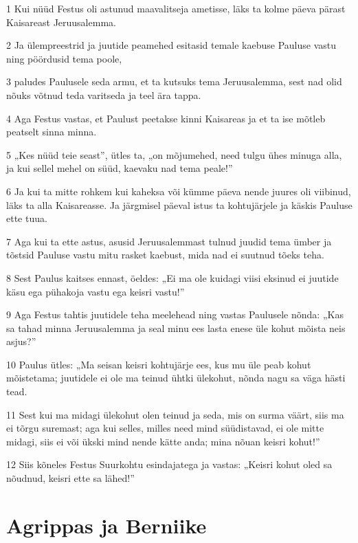 \par 1 Kui nüüd Festus oli astunud maavalitseja ametisse, läks ta kolme päeva pärast Kaisareast Jeruusalemma.
\par 2 Ja ülempreestrid ja juutide peamehed esitasid temale kaebuse Pauluse vastu ning pöördusid tema poole,
\par 3 paludes Paulusele seda armu, et ta kutsuks tema Jeruusalemma, sest nad olid nõuks võtnud teda varitseda ja teel ära tappa.
\par 4 Aga Festus vastas, et Paulust peetakse kinni Kaisareas ja et ta ise mõtleb peatselt sinna minna.
\par 5 „Kes nüüd teie seast”, ütles ta, „on mõjumehed, need tulgu ühes minuga alla, ja kui sellel mehel on süüd, kaevaku nad tema peale!”
\par 6 Ja kui ta mitte rohkem kui kaheksa või kümme päeva nende juures oli viibinud, läks ta alla Kaisareasse. Ja järgmisel päeval istus ta kohtujärjele ja käskis Pauluse ette tuua.
\par 7 Aga kui ta ette astus, asusid Jeruusalemmast tulnud juudid tema ümber ja tõstsid Pauluse vastu mitu rasket kaebust, mida nad ei suutnud tõeks teha.
\par 8 Sest Paulus kaitses ennast, öeldes: „Ei ma ole kuidagi viisi eksinud ei juutide käsu ega pühakoja vastu ega keisri vastu!”
\par 9 Aga Festus tahtis juutidele teha meelehead ning vastas Paulusele nõnda: „Kas sa tahad minna Jeruusalemma ja seal minu ees lasta enese üle kohut mõista neis asjus?”
\par 10 Paulus ütles: „Ma seisan keisri kohtujärje ees, kus mu üle peab kohut mõistetama; juutidele ei ole ma teinud ühtki ülekohut, nõnda nagu sa väga hästi tead.
\par 11 Sest kui ma midagi ülekohut olen teinud ja seda, mis on surma väärt, siis ma ei tõrgu suremast; aga kui selles, milles need mind süüdistavad, ei ole mitte midagi, siis ei või ükski mind nende kätte anda; mina nõuan keisri kohut!”
\par 12 Siis kõneles Festus Suurkohtu esindajatega ja vastas: „Keisri kohut oled sa nõudnud, keisri ette sa lähed!”

\section*{Agrippas ja Berniike}

